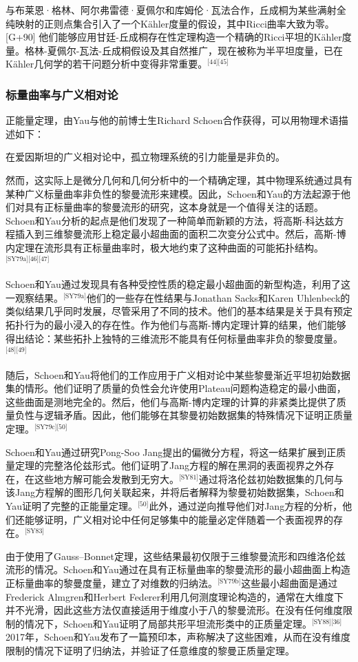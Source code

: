 与布莱恩·格林、阿尔弗雷德·夏佩尔和库姆伦·瓦法合作，丘成桐为某些满射全纯映射的正则点集合引入了一个Kähler度量的假设，其中Ricci曲率大致为零。[G+90] 他们能够应用甘廷-丘成桐存在性定理构造一个精确的Ricci平坦的Kähler度量。格林-夏佩尔-瓦法-丘成桐假设及其自然推广，现在被称为半平坦度量，已在Kähler几何学的若干问题分析中变得非常重要。\(^\text{[44][45]}\)
\subsubsection{标量曲率与广义相对论}
正能量定理，由Yau与他的前博士生Richard Schoen合作获得，可以用物理术语描述如下：

在爱因斯坦的广义相对论中，孤立物理系统的引力能量是非负的。

然而，这实际上是微分几何和几何分析中的一个精确定理，其中物理系统通过具有某种广义标量曲率非负性的黎曼流形来建模。因此，Schoen和Yau的方法起源于他们对具有正标量曲率的黎曼流形的研究，这本身就是一个值得关注的话题。Schoen和Yau分析的起点是他们发现了一种简单而新颖的方法，将高斯-科达兹方程插入到三维黎曼流形上稳定最小超曲面的面积二次变分公式中。然后，高斯-博内定理在流形具有正标量曲率时，极大地约束了这种曲面的可能拓扑结构。\(^\text{[SY79a][46][47]}\)

Schoen和Yau通过发现具有各种受控性质的稳定最小超曲面的新型构造，利用了这一观察结果。\(^\text{[SY79a]}\)他们的一些存在性结果与Jonathan Sacks和Karen Uhlenbeck的类似结果几乎同时发展，尽管采用了不同的技术。他们的基本结果是关于具有预定拓扑行为的最小浸入的存在性。作为他们与高斯-博内定理计算的结果，他们能够得出结论：某些拓扑上独特的三维流形不能具有任何标量曲率非负的黎曼度量。\(^\text{[48][49]}\)

随后，Schoen和Yau将他们的工作应用于广义相对论中某些黎曼渐近平坦初始数据集的情形。他们证明了质量的负性会允许使用Plateau问题构造稳定的最小曲面，这些曲面是测地完全的。然后，他们与高斯-博内定理的计算的非紧类比提供了质量负性与逻辑矛盾。因此，他们能够在其黎曼初始数据集的特殊情况下证明正质量定理。\(^\text{[SY79c][50]}\)

Schoen和Yau通过研究Pong-Soo Jang提出的偏微分方程，将这一结果扩展到正质量定理的完整洛伦兹形式。他们证明了Jang方程的解在黑洞的表面视界之外存在，在这些地方解可能会发散到无穷大。\(^\text{[SY81]}\)通过将洛伦兹初始数据集的几何与该Jang方程解的图形几何关联起来，并将后者解释为黎曼初始数据集，Schoen和Yau证明了完整的正能量定理。\(^\text{[50]}\)此外，通过逆向推导他们对Jang方程的分析，他们还能够证明，广义相对论中任何足够集中的能量必定伴随着一个表面视界的存在。\(^\text{[SY83]}\)

由于使用了Gauss–Bonnet定理，这些结果最初仅限于三维黎曼流形和四维洛伦兹流形的情况。Schoen和Yau通过在具有正标量曲率的黎曼流形的最小超曲面上构造正标量曲率的黎曼度量，建立了对维数的归纳法。\(^\text{[SY79b]}\)这些最小超曲面是通过Frederick Almgren和Herbert Federer利用几何测度理论构造的，通常在大维度下并不光滑，因此这些方法仅直接适用于维度小于八的黎曼流形。在没有任何维度限制的情况下，Schoen和Yau证明了局部共形平坦流形类中的正质量定理。\(^\text{[SY88][36]}\)2017年，Schoen和Yau发布了一篇预印本，声称解决了这些困难，从而在没有维度限制的情况下证明了归纳法，并验证了任意维度的黎曼正质量定理。

